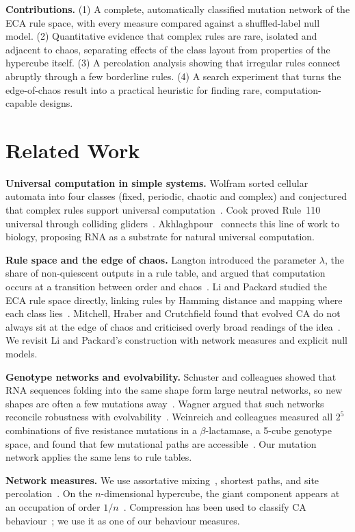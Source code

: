 \documentclass[10pt,letterpaper,twocolumn]{article}
\newcommand{\para}[1]{\textbf{#1}\hspace{0.4em}}
\begin{document}
\para{Contributions.} (1) A complete, automatically classified mutation network of the ECA rule space, with every measure compared against a shuffled-label null model. (2) Quantitative evidence that complex rules are rare, isolated and adjacent to chaos, separating effects of the class layout from properties of the hypercube itself. (3) A percolation analysis showing that irregular rules connect abruptly through a few borderline rules. (4) A search experiment that turns the edge-of-chaos result into a practical heuristic for finding rare, computation-capable designs.

\section{Related Work}

\para{Universal computation in simple systems.} Wolfram sorted cellular automata into four classes (fixed, periodic, chaotic and complex) and conjectured that complex rules support universal computation~\cite{wolfram1984}. Cook proved Rule~110 universal through colliding gliders~\cite{cook2004}. Akhlaghpour~\cite{akhlaghpour2022} connects this line of work to biology, proposing RNA as a substrate for natural universal computation.

\para{Rule space and the edge of chaos.} Langton introduced the parameter $\lambda$, the share of non-quiescent outputs in a rule table, and argued that computation occurs at a transition between order and chaos~\cite{langton1990}. Li and Packard studied the ECA rule space directly, linking rules by Hamming distance and mapping where each class lies~\cite{lipackard1990}. Mitchell, Hraber and Crutchfield found that evolved CA do not always sit at the edge of chaos and criticised overly broad readings of the idea~\cite{mitchell1993}. We revisit Li and Packard's construction with network measures and explicit null models.

\para{Genotype networks and evolvability.} Schuster and colleagues showed that RNA sequences folding into the same shape form large neutral networks, so new shapes are often a few mutations away~\cite{schuster1994}. Wagner argued that such networks reconcile robustness with evolvability~\cite{wagner2008}. Weinreich and colleagues measured all $2^5$ combinations of five resistance mutations in a $\beta$-lactamase, a 5-cube genotype space, and found that few mutational paths are accessible~\cite{weinreich2006}. Our mutation network applies the same lens to rule tables.

\para{Network measures.} We use assortative mixing~\cite{newman2003}, shortest paths, and site percolation~\cite{stauffer1994,callaway2000}. On the $n$-dimensional hypercube, the giant component appears at an occupation of order $1/n$~\cite{ajtai1982}. Compression has been used to classify CA behaviour~\cite{zenil2010}; we use it as one of our behaviour measures.
\end{document}
